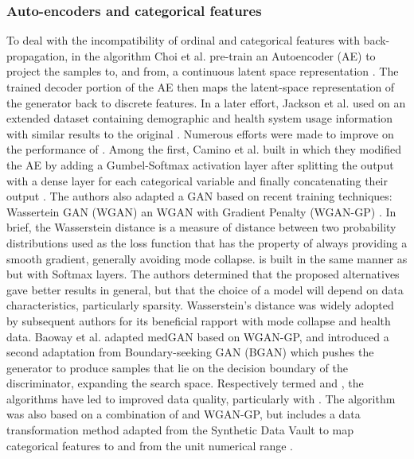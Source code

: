 \subsubsection{Auto-encoders and categorical features}
To deal with the incompatibility of ordinal and categorical features with back-propagation, in the algorithm  Choi et al. pre-train an Autoencoder (AE) to project the samples to, and from, a continuous latent space representation \cite{choi2017generating}. The trained decoder portion of the AE then maps the latent-space representation of the generator back to discrete features. In a later effort, Jackson et al. used  on an extended dataset containing demographic and health system usage information with similar results to the original \cite{Jackson_2019}. Numerous efforts were made to improve on the performance of . Among the first, Camino et al. built  in which they modified the AE by adding a Gumbel-Softmax activation layer after splitting the output with a dense layer for each categorical variable and finally concatenating their output \cite{Camino2018-re}. The authors also adapted a GAN based on recent training techniques: Wassertein GAN (WGAN) \cite{arjovsky2017wasserstein} an WGAN with Gradient Penalty (WGAN-GP) \cite{gulrajani2017improved}. In brief, the Wasserstein distance is a measure of distance between two probability distributions used as the loss function that has the property of always providing a smooth gradient, generally avoiding mode collapse.  is built in the same manner as  but with Softmax layers. The authors determined that the proposed alternatives gave better results in general, but that the choice of a model will depend on data characteristics, particularly sparsity. Wasserstein's distance was widely adopted by subsequent authors for its beneficial rapport with mode collapse and health data. Baoway et al. adapted medGAN based on WGAN-GP, and introduced a second adaptation from Boundary-seeking GAN (BGAN) \cite{hjelm2017boundaryseeking} which pushes the generator to produce samples that lie on the decision boundary of the discriminator, expanding the search space. Respectively termed  and , the algorithms have led to improved data quality, particularly with  \cite{Baowaly_2019,Baowaly2019}. The  algorithm was also based on a combination of  and WGAN-GP, but includes a data transformation method adapted from the Synthetic Data Vault \cite{Patki_2016} to map categorical features to and from the unit numerical range \cite{Yale_2020}. 

